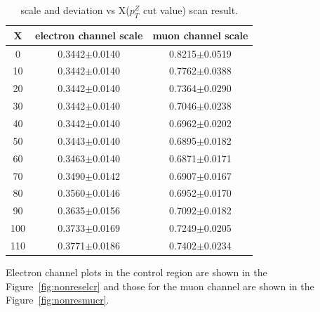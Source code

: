 \begin{table}[htbp]
  \begin{center}
    \caption{
      scale and deviation vs X($p_{T}^{Z}$ cut value) scan result.      
      \label{tab:nonressfdev}}
    \begin{tabular}{c c c}
      \hline\hline
      X & electron channel scale & muon channel scale\\
      \hline
      0  & 0.3442$\pm$0.0140 & 0.8215$\pm$0.0519 \\
      10 & 0.3442$\pm$0.0140 & 0.7762$\pm$0.0388 \\
      20 & 0.3442$\pm$0.0140 & 0.7364$\pm$0.0290 \\
      30 & 0.3442$\pm$0.0140 & 0.7046$\pm$0.0238 \\
      40 & 0.3442$\pm$0.0140 & 0.6962$\pm$0.0202 \\
      50 & 0.3443$\pm$0.0140 & 0.6895$\pm$0.0182 \\
      60 & 0.3463$\pm$0.0140 & 0.6871$\pm$0.0171 \\
      70 & 0.3490$\pm$0.0142 & 0.6907$\pm$0.0167 \\
      80 & 0.3560$\pm$0.0146 & 0.6952$\pm$0.0170 \\
      90 & 0.3635$\pm$0.0156 & 0.7092$\pm$0.0182 \\
      100 & 0.3733$\pm$0.0169 & 0.7249$\pm$0.0205 \\
      110 & 0.3771$\pm$0.0186 & 0.7402$\pm$0.0234 \\
      \hline\hline
    \end{tabular}
  \end{center}
\end{table}

\vspace{0.3cm}
Electron channel plots in the control region are shown in the Figure~\ref{fig:nonreselcr} and those for the muon channel are shown in the Figure~\ref{fig:nonresmucr}.

